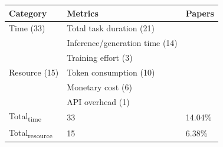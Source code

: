 \begin{tabular} { p{} p{} p{} } \\ 
\toprule 
Category & Metrics & Papers\\ 
\midrule  
Time (33) & Total task duration (21) & \cite{ \paperfourteenth,\papereighteenth,\papertwentysecond,\paperfortyeighth,\paperfiftyfirst,\paperfiftyfifth,\paperseventyfourth,\paperonehundredseventh,\paperonehundredtenth,\paperonehundredthirteenth,\paperonehundredtwentieth,\paperonehundredthirtysecond,\paperonehundredfortyninth,\paperonehundredfiftyfourth,\paperonehundredsixtysecond,\paperonehundredseventysecond,\paperonehundredninetysecond,\paperonehundredninetyfifth,\papertwohundredseventh,\papertwohundrednineteenth,\papertwohundredtwentyfirst }\\ 
 & Inference/generation time (14) & \cite{ \paperfifteenth,\paperthirtythird,\paperfortyeighth,\paperfiftyfirst,\papersixtyseventh,\papereightyfourth,\paperonehundredeighteenth,\paperonehundredthirtythird,\paperonehundredfortyninth,\paperonehundredninetyfifth,\paperonehundredninetyeighth,\papertwohundredthird,\papertwohundredeleventh,\papertwohundredthirtyseventh }\\ 
 & Training effort (3) & \cite{ \paperonehundredfortieth,\paperonehundredfortyfirst,\papertwohundredthirtyseventh }\\ 
Resource (15) & Token consumption (10) & \cite{ \paperseventh,\paperthirteenth,\paperthirtysecond,\paperfortysixth,\paperfortyeighth,\papereightyfourth,\paperonehundredth,\paperonehundredthirtyninth,\paperonehundredsixtysecond,\papertwohundrednineteenth }\\ 
 & Monetary cost (6) & \cite{ \paperthird,\papereighth,\paperthirteenth,\paperfortyeighth,\paperonehundredtenth,\paperonehundredninetysecond }\\ 
 & API overhead (1) & \cite{ \paperonehundrednineteenth }\\ 
\midrule  
Total\textsubscript{time} &  33  &  {14.04}\% \\ 
Total\textsubscript{resource} &  15  &  {6.38}\% \\ 
\bottomrule 
\end{tabular} 

